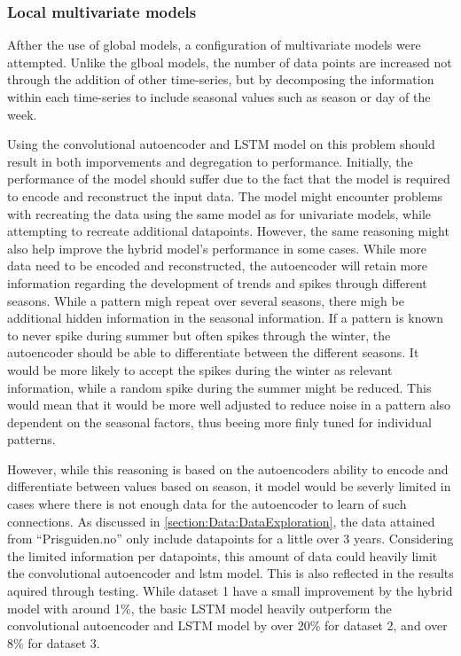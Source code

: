 \subsubsection{Local multivariate models}

Afther the use of global models, a configuration of multivariate models were attempted.
Unlike the glboal models,
the number of data points are increased not through the addition of other time-series,
but by decomposing the information within each time-series to include seasonal values such as season or day of the week.

Using the convolutional autoencoder and LSTM model on this problem should result in both imporvements and degregation to performance.
Initially, the performance of the model should suffer due to the fact that the model is required to encode and reconstruct the
input data.
The model might encounter problems with recreating the data using the same model as for univariate models,
while attempting to recreate additional datapoints.
However, the same reasoning might also help improve the hybrid model's performance in some cases.
While more data need to be encoded and reconstructed, the autoencoder will retain more information
regarding the development of trends and spikes through different seasons.
While a pattern migh repeat over several seasons, there migh be additional hidden information in the seasonal information.
If a pattern is known to never spike during summer but often spikes through the winter,
the autoencoder should be able to differentiate between the different seasons.
It would be more likely to accept the spikes during the winter as relevant information, while a random spike during the summer might be reduced.
This would mean that it would be more well adjusted to reduce noise in a pattern also dependent on the seasonal factors,
thus beeing more finly tuned for individual patterns.

However, while this reasoning is based on the autoencoders ability to encode and differentiate between values based on season,
it model would be severly limited in cases where there is not enough data for the autoencoder to learn of such connections.
As discussed in \cref{section:Data:DataExploration}, the data attained from ``Prisguiden.no'' only include datapoints
for a little over 3 years.
Considering the limited information per datapoints, this amount of data could heavily limit the convolutional autoencoder and lstm model.
This is also reflected in the results aquired through testing.
While dataset 1 have a small improvement by the hybrid model with around 1\%,
the basic LSTM model heavily outperform the convolutional autoencoder and LSTM model by over 20\% for dataset 2, and over 8\% for dataset 3.

